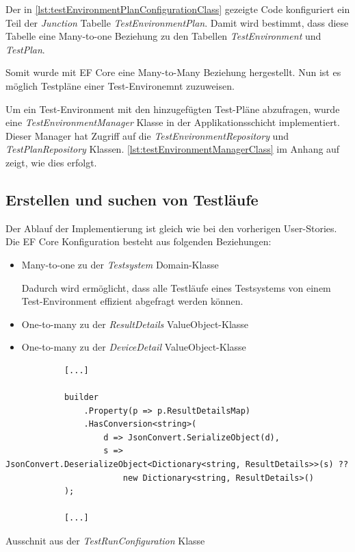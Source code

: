 \documentclass[a4paper, fontsize=11pt, parskip=half, twoside]{scrreprt}
\begin{document}
	Der in \autoref{lst:testEnvironmentPlanConfigurationClass} gezeigte Code konfiguriert ein Teil der \emph{Junction} Tabelle \emph{TestEnvironmentPlan}.
	Damit wird bestimmt, dass diese Tabelle eine Many-to-one Beziehung zu den Tabellen \emph{TestEnvironment} und \emph{TestPlan}.
	
	Somit wurde mit \ac{EF} Core eine Many-to-Many Beziehung hergestellt. 
	Nun ist es möglich Testpläne einer Test-Environemnt zuzuweisen.
	
	Um ein Test-Environment mit den hinzugefügten Test-Pläne abzufragen, wurde eine \emph{TestEnvironmentManager} Klasse in der Applikationsschicht implementiert.
	Dieser Manager hat Zugriff auf die \emph{TestEnvironmentRepository} und \emph{TestPlanRepository} Klassen.
	\autoref{lst:testEnvironmentManagerClass} im Anhang auf  zeigt, wie dies erfolgt.
	
	\subsection{Erstellen und suchen von Testläufe} \label{subsec:createAndSearchTestruns}
	
	Der Ablauf der Implementierung ist gleich wie bei den vorherigen User-Stories.
	Die \ac{EF} Core Konfiguration besteht aus folgenden Beziehungen:
	
	\begin{itemize}
		\item Many-to-one zu der \emph{Testsystem} Domain-Klasse
		
		Dadurch wird ermöglicht, dass alle Testläufe eines Testsystems von einem Test-Environment effizient abgefragt werden können.
		
		\item One-to-many zu der \emph{ResultDetails} ValueObject-Klasse
		\item One-to-many zu der \emph{DeviceDetail} ValueObject-Klasse
	\end{itemize}
	
	\begin{listing}[ht]
		\begin{verbatim}
			[...]
			
			builder
				.Property(p => p.ResultDetailsMap)
				.HasConversion<string>(
					d => JsonConvert.SerializeObject(d),
					s => JsonConvert.DeserializeObject<Dictionary<string, ResultDetails>>(s) ??
						new Dictionary<string, ResultDetails>()
			);
			
			[...]
		\end{verbatim}
		\caption{Ausschnit aus der \emph{TestRunConfiguration} Klasse}
		\label{lst:testRunConfigurationClass}
	\end{listing}
	
\end{document}
